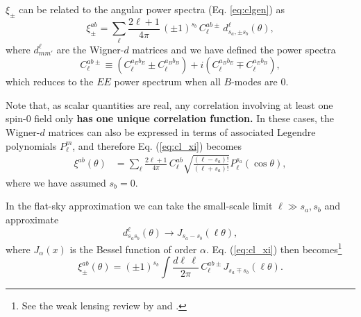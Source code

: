 \documentclass[\docopts]{\docclass}
\begin{document}
$\xi_{\pm}$ can be related to the angular power spectra (Eq. \ref{eq:clgen}) as
\begin{equation}\label{eq:cl_xi}
 \xi^{ab}_\pm = \sum_\ell\frac{2\ell+1}{4\pi}\,(\pm1)^{s_b}\,C^{ab\pm}_\ell\,d^\ell_{s_a,\pm s_b}(\theta),
\end{equation}
where $d^\ell_{mm'}$ are the Wigner-$d$ matrices \citep{Ng1999,2004MNRAS.350..914C} and we have defined the power spectra
\begin{equation}
  C^{ab\pm}_\ell\equiv\left(C^{a_Eb_E}_\ell\pm C^{a_Bb_B}_\ell\right)+i\left(C^{a_Bb_E}_\ell\mp C^{a_Eb_B}_\ell\right),
\end{equation}
which reduces to the $EE$ power spectrum when all $B$-modes are 0.

Note that, as scalar quantities are real, any correlation involving at least one spin-$0$ field only {\bf has one unique correlation function.} In these cases, the Wigner-$d$ matrices can also be expressed in terms of associated Legendre polynomials $P^m_\ell$, and therefore Eq. (\ref{eq:cl_xi}) becomes
\begin{align}
  \xi^{ab}(\theta)&=\sum_\ell\frac{2\ell+1}{4\pi}\,C^{ab}_\ell\sqrt{\frac{(\ell-s_a)!}{(\ell+s_a)!}}P^{s_a}_\ell(\cos\theta)\label{eq:xigg},
\end{align}
where we have assumed $s_b=0$.

In the flat-sky approximation we can take the small-scale limit $\ell\gg s_a,s_b$ and approximate 
\begin{equation}
  d_{s_as_b}^\ell(\theta)\longrightarrow J_{s_a-s_b}(\ell\theta),
\end{equation}
where $J_\alpha(x)$ is the Bessel function of order $\alpha$. Eq. (\ref{eq:cl_xi}) then becomes\footnote{See the weak lensing review by \citet{Bartelmann01} and \citet{Joachimi10}.}
\begin{equation}
  \xi^{ab}_{\pm}(\theta)=\left(\pm1\right)^{s_b}\int\frac{d\ell\,\ell}{2\pi}\,C^{ab\pm}_\ell J_{s_a\mp s_b}(\ell\theta).
\end{equation}
\end{document}
